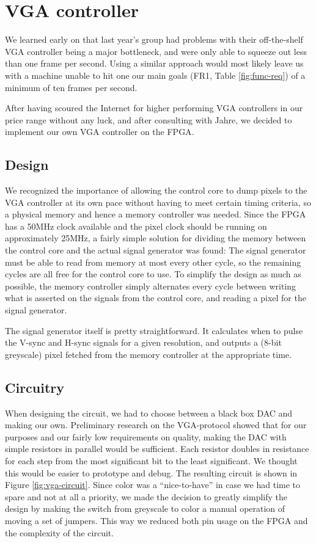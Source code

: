\section{VGA controller}

We learned early on that last year's group had problems with their off-the-shelf
\ac{VGA} controller being a major bottleneck, and were only able to squeeze out
less than one frame per second. Using a similar approach would most likely leave
us with a machine unable to hit one our main goals (FR1, Table \ref{fig:func-req})
of a minimum of ten frames per second.

After having scoured the Internet for higher performing \ac{VGA} controllers in our
price range without any luck, and after consulting with Jahre, we decided to
implement our own \ac{VGA} controller on the \ac{FPGA}.



\subsection{Design}
We recognized the importance of allowing the control core to dump pixels to the
\ac{VGA} controller at its own pace without having to meet certain timing criteria,
so a physical memory and hence a memory controller was needed. Since the \ac{FPGA}
has a 50MHz clock available and the pixel clock should be running on approximately
25MHz, a fairly simple solution for dividing the memory between the control
core and the actual signal generator was found: The signal generator must be
able to read from memory at most every other cycle, so the remaining cycles are
all free for the control core to use. To simplify the design as much as
possible, the memory controller simply alternates every cycle between writing
what is asserted on the signals from the control core, and reading a pixel
for the signal generator.

The signal generator itself is pretty straightforward. It calculates
when to pulse the V-sync and H-sync signals for a given resolution, and outputs
a (8-bit greyscale) pixel fetched from the memory controller at the appropriate
time.

\subsection{Circuitry}
 

When designing the circuit, we had to choose between a black box \ac{DAC} and
making our own. Preliminary research on the \ac{VGA}-protocol showed that for
our purposes and our fairly low requirements on quality, making the \ac{DAC}
with simple resistors in parallel would be sufficient. Each resistor doubles in
resistance for each step from the most significant bit to the least
significant. We thought this would be easier to prototype and debug. The
resulting circuit is shown in Figure \ref{fig:vga-circuit}. Since color was a
``nice-to-have'' in case we had time to spare and not at all a priority, we made
the decision to greatly simplify the design by making the switch from greyscale
to color a manual operation of moving a set of jumpers. This way we reduced both
pin usage on the \ac{FPGA} and the complexity of the circuit.
